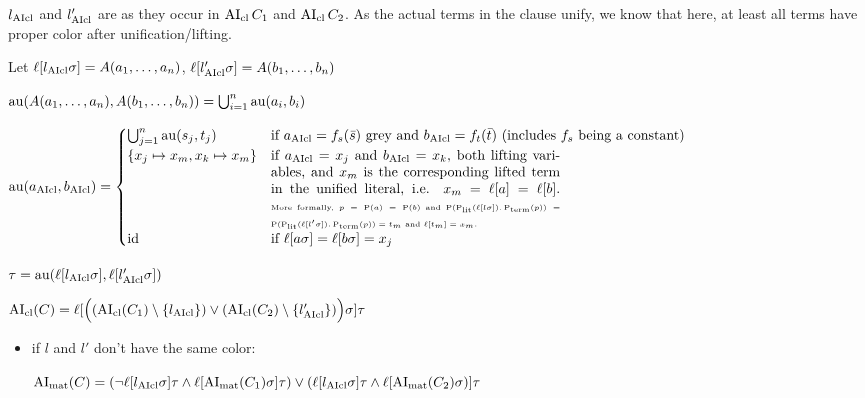 \documentclass[,%
	paper=a4,%
	DIV10, %
	twoside=false,%
	liststotoc,
	bibtotoc,
	draft=false,%
	numbers=noendperiod
]{scrartcl}
\begin{document}
\begin{enumerate}
		$l_{\operatorname{AIcl}}$ and $l'_{\operatorname{AIcl}}$ are as they occur in $\operatorname{AI}_\mathrm{cl}{C_1}$ and $\operatorname{AI}_\mathrm{cl}{C_2}$. As the actual terms in the clause unify, we know that here, at least all terms have proper color after unification/lifting.

		Let 
		$\ell[l_{\operatorname{AIcl}}\sigma] = A(a_1, \dotsc, a_n)$, $\ell[l_{\operatorname{AIcl}}'\sigma] = A(b_1, \dotsc, b_n)$

		$\operatorname{au}(A(a_1, \dotsc, a_n), A(b_1, \dotsc, b_n)) = \bigcup_{i=1}^n \operatorname{au}(a_i, b_i)$

		$ \aiu (a\fromclause, b\fromclause) =
		\begin{cases}
			\bigcup_{j=1}^n \aiu(s_j, t_j) & \text{if $a\cl=f_s(\bar s)$ grey and $b\cl = f_t(\bar t)$ (includes $f_s$ being a constant)} \\
			\{x_j \mapsto x_m, x_k \mapsto x_m\} & \parbox[t]{.6\textwidth}{if $a\cl = x_j$ and $b\cl = x_k$, both lifting variables, and $x_m$ is the corresponding lifted term in the unified literal, i.e. $x_m = \lifboth{a} = \lifboth{b}$.
			{\tiny

				More formally, $p = \pos(a) = \pos(b)$ and $\pos(\poslit(\lifboth{l\sigma}).\posterm(p)) = \pos(\poslit(\lifboth{l'\sigma}).\posterm(p)) = t_m$ and $\lifboth{t_m} = x_m$.

		}}\\
				\id & \text{if $\lifboth{a\sigma} = \lifboth{b\sigma} = x_j$ }
			\end{cases} $

			$\tau = \operatorname{au}(\ell[l_{\operatorname{AIcl}}\sigma], \ell[l'_{\operatorname{AIcl}}\sigma])$


		$\operatorname{AI}_\mathrm{cl}(C) =
		\ell[\Big( (\operatorname{AI}_\mathrm{cl}(C_1) \setminus \{l_{\operatorname{AIcl}}\}) \lor (\operatorname{AI}_\mathrm{cl}(C_2)\setminus \{l_{\operatorname{AIcl}}'\}) \Big)\sigma] \tau$ 

		

		\begin{itemize}
			\item if $l$ and $l'$ don't have the same color:

				$\operatorname{AI}_\mathrm{mat}(C) =
				(\lnot {\ell[l\ensuremath{_{\operatorname{AIcl}}}\sigma]\tau} \land \ell[\operatorname{AI}_\mathrm{mat}(C_1)\sigma]\tau) \lor
				(\ell[l_{\operatorname{AIcl}}\sigma]\tau \land \ell[\operatorname{AI}_\mathrm{mat}(C_2)\sigma) ]\tau
				$






\end{itemize}
\end{enumerate}
\end{document}

